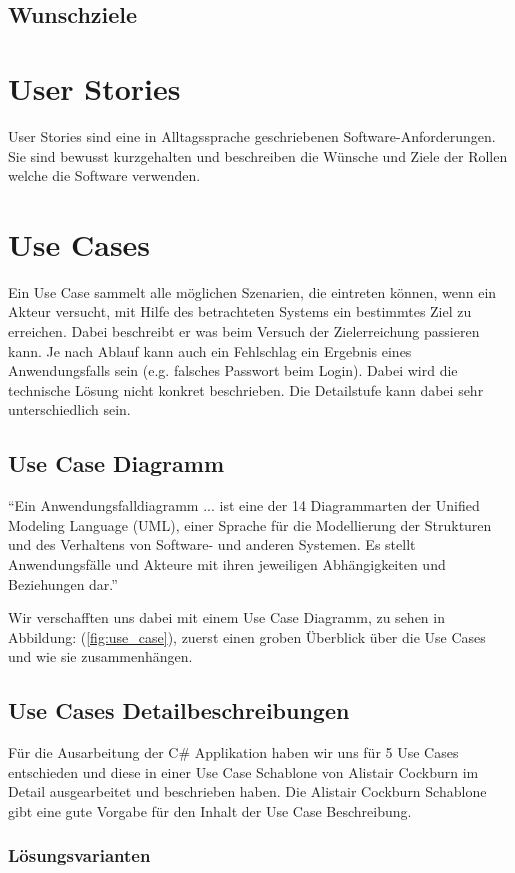 \subsection{Wunschziele}
\section{User Stories}
User Stories sind eine in Alltagssprache geschriebenen
Software-Anforderungen. Sie sind bewusst kurzgehalten und
beschreiben die Wünsche und Ziele der Rollen welche die
Software verwenden.
\section{Use Cases}
Ein Use Case sammelt alle möglichen Szenarien, die eintreten können,
wenn ein Akteur versucht, mit Hilfe des betrachteten Systems ein
bestimmtes Ziel zu erreichen. Dabei beschreibt er was beim Versuch der
Zielerreichung passieren kann. Je nach Ablauf kann auch ein Fehlschlag
ein Ergebnis eines Anwendungsfalls sein (e.g. falsches Passwort beim
Login). Dabei wird die technische Lösung nicht konkret beschrieben.
Die Detailstufe kann dabei sehr unterschiedlich sein.

\subsection{Use Case Diagramm}
``Ein Anwendungsfalldiagramm ... ist eine der 14 Diagrammarten der
Unified Modeling Language (UML), einer Sprache für die Modellierung
der Strukturen und des Verhaltens von Software- und anderen Systemen.
Es stellt Anwendungsfälle und Akteure mit ihren jeweiligen
Abhängigkeiten und Beziehungen dar.''\cite{dbcs7}

Wir verschafften uns dabei mit einem Use Case Diagramm, zu sehen in
Abbildung: (\ref{fig:use_case}), zuerst einen groben Überblick über
die Use Cases und wie sie zusammenhängen.

\subsection{Use Cases Detailbeschreibungen}
Für die Ausarbeitung der C\# Applikation haben wir uns für 5 Use Cases
entschieden und diese in einer Use Case Schablone von Alistair
Cockburn im Detail ausgearbeitet und beschrieben haben. Die Alistair
Cockburn Schablone gibt eine gute Vorgabe für den Inhalt der Use Case
Beschreibung.

\subsubsection{Lösungsvarianten}
